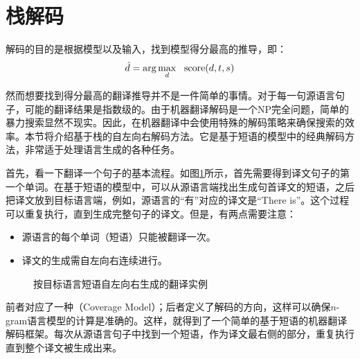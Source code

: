 \sectionnewpage
\section{栈解码}

\parinterval 解码的目的是根据模型以及输入，找到模型得分最高的推导，即：
\begin{eqnarray}
\hat{d} = \arg\max_{d}\ \ \textrm{score}(d,{t},{s})
\label{eq:7-21}
\end{eqnarray}

\parinterval 然而想要找到得分最高的翻译推导并不是一件简单的事情。对于每一句源语言句子，可能的翻译结果是指数级的。由于机器翻译解码是一个NP完全问题，简单的暴力搜索显然不现实。因此，在机器翻译中会使用特殊的解码策略来确保搜索的效率。本节将介绍基于栈的自左向右解码方法。它是基于短语的模型中的经典解码方法，非常适于处理语言生成的各种任务。

\parinterval 首先，看一下翻译一个句子的基本流程。如图\ref{fig:7-26}所示，首先需要得到译文句子的第一个单词。在基于短语的模型中，可以从源语言端找出生成句首译文的短语，之后把译文放到目标语言端，例如，源语言的“有”对应的译文是“There is”。这个过程可以重复执行，直到生成完整句子的译文。但是，有两点需要注意：

\begin{itemize}
\vspace{0.5em}
\item 源语言的每个单词（短语）只能被翻译一次。
\vspace{0.5em}
\item 译文的生成需自左向右连续进行。
\vspace{0.5em}
\end{itemize}

\begin{figure}[htp]
\centering

\caption{按目标语言短语自左向右生成的翻译实例}
\label{fig:7-26}
\end{figure}

\parinterval 前者对应了一种{\small{}}（Coverage Model）；后者定义了解码的方向，这样可以确保$n$-gram语言模型的计算是准确的。这样，就得到了一个简单的基于短语的机器翻译解码框架。每次从源语言句子中找到一个短语，作为译文最右侧的部分，重复执行直到整个译文被生成出来。


